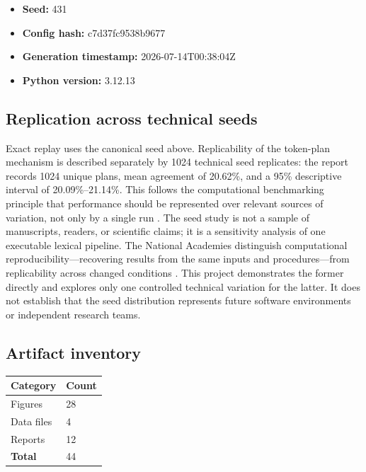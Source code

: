 \documentclass[
  english,
]{article}
\newcounter{none} %
\providecommand{\tightlist}{%
  \setlength{\itemsep}{0pt}\setlength{\parskip}{0pt}}
\begin{document}
\begin{itemize}
\tightlist
\item
  \textbf{Seed:} 431
\item
  \textbf{Config hash:} c7d37fc9538b9677
\item
  \textbf{Generation timestamp:} 2026-07-14T00:38:04Z
\item
  \textbf{Python version:} 3.12.13
\end{itemize}

\subsection{Replication across technical
seeds}\label{replication-across-technical-seeds}

Exact replay uses the canonical seed above. Replicability of the
token-plan mechanism is described separately by 1024 technical seed
replicates: the report records 1024 unique plans, mean agreement of
20.62\%, and a 95\% descriptive interval of 20.09\%--21.14\%. This
follows the computational benchmarking principle that performance should
be represented over relevant sources of variation, not only by a single
run \citep{bouthillier2021accounting}. The seed study is not a sample of
manuscripts, readers, or scientific claims; it is a sensitivity analysis
of one executable lexical pipeline. The National Academies distinguish
computational reproducibility---recovering results from the same inputs
and procedures---from replicability across changed conditions
\citep{national_academies_2019_reproducibility}. This project
demonstrates the former directly and explores only one controlled
technical variation for the latter. It does not establish that the seed
distribution represents future software environments or independent
research teams.

\subsection{Artifact inventory}\label{artifact-inventory}

{\def\LTcaptype{none} %
\begin{longtable}[]{@{}ll@{}}
\toprule\noalign{}
Category & Count \\
\midrule\noalign{}
\endhead
\bottomrule\noalign{}
\endlastfoot
Figures & 28 \\
Data files & 4 \\
Reports & 12 \\
\textbf{Total} & 44 \\
\end{longtable}
}
\end{document}
